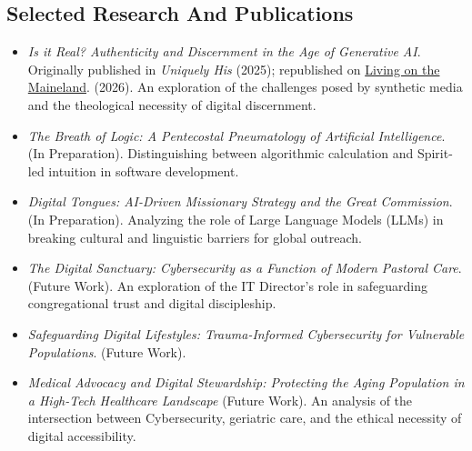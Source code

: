 \documentclass[11pt,letterpaper]{article}
\begin{document}
\begin{itemize}[label=\textcolor{EUMaroon}{\textbullet}, noitemsep]
\section{Selected Research And Publications}
\begin{itemize}[label=\textcolor{EUMaroon}
{\textbullet}, noitemsep]
\item \textit{Is it Real? Authenticity and Discernment in the Age of Generative AI}. Originally published in \textit{Uniquely His} (2025); republished on \href{https://mbmaine.wordpress.com/2026/04/15/is-it-real/}{Living on the Maineland}. (2026). An exploration of the challenges posed by synthetic media and the theological necessity of digital discernment.
\vspace{4pt} %
\item \textit{The Breath of Logic: A Pentecostal Pneumatology of Artificial Intelligence}. (In Preparation). Distinguishing between algorithmic calculation and Spirit-led intuition in software development.
\item \textit{Digital Tongues: AI-Driven Missionary Strategy and the Great Commission}. (In Preparation). Analyzing the role of Large Language Models (LLMs) in breaking cultural and linguistic barriers for global outreach.
\item \textit{The Digital Sanctuary: Cybersecurity as a Function of Modern Pastoral Care}. (Future Work). An exploration of the IT Director's role in safeguarding congregational trust and digital discipleship.
\item \textit{Safeguarding Digital Lifestyles: Trauma-Informed Cybersecurity for Vulnerable Populations}. (Future Work).
\item \textit{Medical Advocacy and Digital Stewardship: Protecting the Aging Population in a High-Tech Healthcare Landscape} (Future Work). An analysis of the intersection between Cybersecurity, geriatric care, and the ethical necessity of digital accessibility.

\end{itemize}

\end{itemize}
\end{document}
